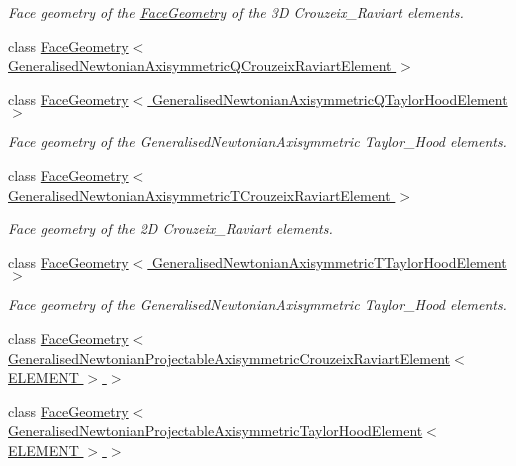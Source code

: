 \begin{DoxyCompactItemize}
\begin{DoxyCompactList}\small\item\em Face geometry of the \hyperlink{classoomph_1_1FaceGeometry}{Face\+Geometry} of the 3D Crouzeix\+\_\+\+Raviart elements. \end{DoxyCompactList}\item 
class \hyperlink{classoomph_1_1FaceGeometry_3_01GeneralisedNewtonianAxisymmetricQCrouzeixRaviartElement_01_4}{Face\+Geometry$<$ Generalised\+Newtonian\+Axisymmetric\+Q\+Crouzeix\+Raviart\+Element $>$}
\item 
class \hyperlink{classoomph_1_1FaceGeometry_3_01GeneralisedNewtonianAxisymmetricQTaylorHoodElement_01_4}{Face\+Geometry$<$ Generalised\+Newtonian\+Axisymmetric\+Q\+Taylor\+Hood\+Element $>$}
\begin{DoxyCompactList}\small\item\em Face geometry of the Generalised\+Newtonian\+Axisymmetric Taylor\+\_\+\+Hood elements. \end{DoxyCompactList}\item 
class \hyperlink{classoomph_1_1FaceGeometry_3_01GeneralisedNewtonianAxisymmetricTCrouzeixRaviartElement_01_4}{Face\+Geometry$<$ Generalised\+Newtonian\+Axisymmetric\+T\+Crouzeix\+Raviart\+Element $>$}
\begin{DoxyCompactList}\small\item\em Face geometry of the 2D Crouzeix\+\_\+\+Raviart elements. \end{DoxyCompactList}\item 
class \hyperlink{classoomph_1_1FaceGeometry_3_01GeneralisedNewtonianAxisymmetricTTaylorHoodElement_01_4}{Face\+Geometry$<$ Generalised\+Newtonian\+Axisymmetric\+T\+Taylor\+Hood\+Element $>$}
\begin{DoxyCompactList}\small\item\em Face geometry of the Generalised\+Newtonian\+Axisymmetric Taylor\+\_\+\+Hood elements. \end{DoxyCompactList}\item 
class \hyperlink{classoomph_1_1FaceGeometry_3_01GeneralisedNewtonianProjectableAxisymmetricCrouzeixRaviartElement_3_01ELEMENT_01_4_01_4}{Face\+Geometry$<$ Generalised\+Newtonian\+Projectable\+Axisymmetric\+Crouzeix\+Raviart\+Element$<$ E\+L\+E\+M\+E\+N\+T $>$ $>$}
\item 
class \hyperlink{classoomph_1_1FaceGeometry_3_01GeneralisedNewtonianProjectableAxisymmetricTaylorHoodElement_3_01ELEMENT_01_4_01_4}{Face\+Geometry$<$ Generalised\+Newtonian\+Projectable\+Axisymmetric\+Taylor\+Hood\+Element$<$ E\+L\+E\+M\+E\+N\+T $>$ $>$}

\end{DoxyCompactItemize}
